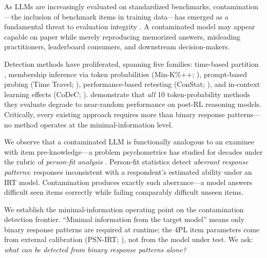 \documentclass[11pt,twocolumn]{article}
\begin{document}
As LLMs are increasingly evaluated on standardized benchmarks, contamination---the inclusion of benchmark items in training data---has emerged as a fundamental threat to evaluation integrity \citep{sainz2023chatgpt,zhou2023dont}. A contaminated model may appear capable on paper while merely reproducing memorized answers, misleading practitioners, leaderboard consumers, and downstream decision-makers.

Detection methods have proliferated, spanning five families: time-based partition \citep{jacovi2023stop}, membership inference via token probabilities (Min-K\%++; \citealp{shi2024detecting,zhang2024mink}), prompt-based probing (Time Travel; \citealp{oren2024proving}), performance-based retesting (ConStat; \citealp{dekoninck2024constat}), and in-context learning effects (CoDeC; \citealp{wu2026codec}). \citet{wang2025rlcontam} demonstrate that \emph{all} 10 token-probability methods they evaluate degrade to near-random performance on post-RL reasoning models. Critically, every existing approach requires more than binary response patterns---no method operates at the minimal-information level.

We observe that a contaminated LLM is functionally analogous to an examinee with item pre-knowledge---a problem psychometrics has studied for decades under the rubric of \emph{person-fit analysis} \citep{meijer2001person,karabatsos2003comparing}. Person-fit statistics detect \emph{aberrant response patterns}: responses inconsistent with a respondent's estimated ability under an IRT model. Contamination produces exactly such aberrance---a model answers difficult seen items correctly while failing comparably difficult unseen items.

We establish the minimal-information operating point on the contamination detection frontier. ``Minimal information from the target model'' means only binary response patterns are required at runtime; the 4PL item parameters come from external calibration (PSN-IRT; \citealp{polo2024psnirt}), not from the model under test. We ask: \emph{what can be detected from binary response patterns alone?}
\end{document}
